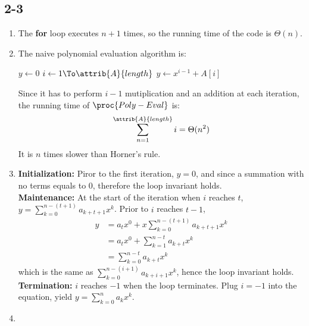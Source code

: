 \subsection{2-3}
\begin{enumerate}[leftmargin=*]
    \item The \textbf{for} loop executes $n+1$ times, so the running time of
        the code is $\Theta(n)$.
    \item The naive polynomial evaluation algorithm is: \\
        \vspace{-1.5em}
        \begin{codebox}
        \li $y\gets 0$
        \li \For $i\gets 1 \To \attrib{A}{length}$
            \Do
        \li     $y\gets x^{i-1}+A[i]$
            \End
        \end{codebox}
        Since it has to perform $i-1$ mutiplication and an addition at each
        iteration, the running time of $\proc{Poly-Eval}$ is:
        \begin{displaymath}
            \sum_{n=1}^{\attrib{A}{length}} i=\Theta(n^2)
        \end{displaymath}
        It is $n$ times slower than Horner's rule.
    \item \textbf{Initialization:} Piror to the first iteration, $y=0$, and
        since a summation with no terms equals to $0$, therefore the loop
        invariant holds. \\
        \textbf{Maintenance:} At the start of the iteration when $i$ reaches $t$,
        $y=\sum_{k=0}^{n-(t+1)}a_{k+t+1}x^k$. Prior to $i$ reaches $t-1$,
        \begin{align*}
            y&= a_tx^0+x\sum_{k=0}^{n-(t+1)}a_{k+t+1}x^k\\
             &= a_tx^0+\sum_{k=1}^{n-t}a_{k+t}x^k\\
             &= \sum_{k=0}^{n-t}a_{k+t}x^k
        \end{align*}
        which is the same as $\sum_{k=0}^{n-(i+1)}a_{k+i+1}x^k$, hence the
        loop invariant holds.\\
        \textbf{Termination:} $i$ reaches $-1$ when the loop terminates.
        Plug $i=-1$ into the equation, yield $y=\sum_{k=0}^{n}a_kx^k$.
    \item
\end{enumerate}
